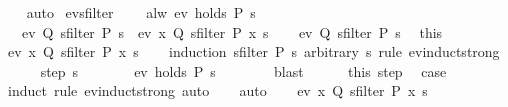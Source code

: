 \begin{isabellebody}
\ \ \isamarkupfalse%
\ auto\isanewline
{}\isamarkupfalse%
%
\endisatagproof
{\isafoldproof}%
%
\isadelimproof
\isanewline
%
\endisadelimproof
\isanewline
{}\isamarkupfalse%
\ ev{\isacharunderscore}sfilter{\isacharcolon}\isanewline
\ \ \ {\isacharasterisk}{\isacharcolon}\ {\isachardoublequoteopen}alw\ {\isacharparenleft}ev\ {\isacharparenleft}holds\ P{\isacharparenright}{\isacharparenright}\ s{\isachardoublequoteclose}\isanewline
\ \ \ {\isachardoublequoteopen}ev\ Q\ {\isacharparenleft}sfilter\ P\ s{\isacharparenright}\ {\isasymlongleftrightarrow}\ ev\ {\isacharparenleft}{\isasymlambda}x{\isachardot}\ Q\ {\isacharparenleft}sfilter\ P\ x{\isacharparenright}{\isacharparenright}\ s{\isachardoublequoteclose}\isanewline
%
\isadelimproof
%
\endisadelimproof
%
\isatagproof
{}\isamarkupfalse%
\isanewline
\ \ \isamarkupfalse%
\ {\isachardoublequoteopen}ev\ Q\ {\isacharparenleft}sfilter\ P\ s{\isacharparenright}{\isachardoublequoteclose}\ \isamarkupfalse%
\ this\ {\isacharasterisk}\ \isamarkupfalse%
\ {\isachardoublequoteopen}ev\ {\isacharparenleft}{\isasymlambda}x{\isachardot}\ Q\ {\isacharparenleft}sfilter\ P\ x{\isacharparenright}{\isacharparenright}\ s{\isachardoublequoteclose}\isanewline
\ \ \isamarkupfalse%
\ {\isacharparenleft}induction\ {\isachardoublequoteopen}sfilter\ P\ s{\isachardoublequoteclose}\ arbitrary{\isacharcolon}\ s\ rule{\isacharcolon}\ ev{\isacharunderscore}induct{\isacharunderscore}strong{\isacharparenright}\isanewline
\ \ \ \ \isamarkupfalse%
\ {\isacharparenleft}step\ s{\isacharparenright}\isanewline
\ \ \ \ \isamarkupfalse%
\ \isamarkupfalse%
\ {\isachardoublequoteopen}ev\ {\isacharparenleft}holds\ P{\isacharparenright}\ s{\isachardoublequoteclose}\isanewline
\ \ \ \ \ \ \isamarkupfalse%
\ blast\isanewline
\ \ \ \ \isamarkupfalse%
\ this\ step\ \isamarkupfalse%
\ {\isacharquery}case\isanewline
\ \ \ \ \ \ \isamarkupfalse%
\ {\isacharparenleft}induct\ rule{\isacharcolon}\ ev{\isacharunderscore}induct{\isacharunderscore}strong{\isacharparenright}\ auto\isanewline
\ \ \isamarkupfalse%
\ auto\isanewline
{}\isamarkupfalse%
\isanewline
\ \ \isamarkupfalse%
\ {\isachardoublequoteopen}ev\ {\isacharparenleft}{\isasymlambda}x{\isachardot}\ Q\ {\isacharparenleft}sfilter\ P\ x{\isacharparenright}{\isacharparenright}\ s{\isachardoublequoteclose}\ \isamarkupfalse%

\end{isabellebody}
